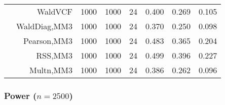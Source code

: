 \documentclass[
]{article}
\begin{document}
\begin{table}[H]
{\begin{tabular}[t]{lrrrrrrr}
\hspace{1em} & WaldVCF & 1000 & 1000 & 24 & 0.400 & 0.269 & 0.105\\

\hspace{1em} & WaldDiag,MM3 & 1000 & 1000 & 24 & 0.370 & 0.250 & 0.098\\

\hspace{1em} & Pearson,MM3 & 1000 & 1000 & 24 & 0.483 & 0.365 & 0.204\\

\hspace{1em} & RSS,MM3 & 1000 & 1000 & 24 & 0.499 & 0.396 & 0.227\\

\hspace{1em} & Multn,MM3 & 1000 & 1000 & 24 & 0.386 & 0.262 & 0.096\\
\bottomrule
\end{tabular}}
\endgroup{}
\end{table}

\hypertarget{power-n2500}{%
\subsubsection{\texorpdfstring{Power
(\(n=2500\))}{Power (n=2500)}}\label{power-n2500}}
\end{document}
